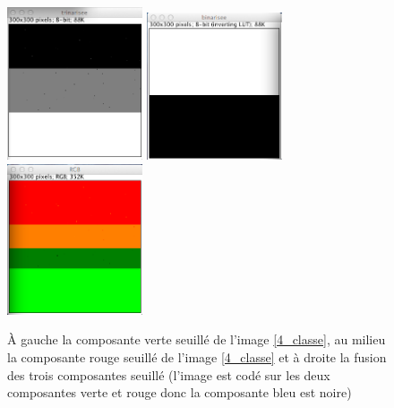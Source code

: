 \documentclass[a4paper,10pt]{article}
\begin{document}
\begin{figure}
\begin{center}
	\includegraphics[width=4cm]{images/4_classe_trinaire}
	\includegraphics[width=4cm]{images/4_classe_binaire}
	\includegraphics[width=4cm]{images/4_classe_fusion}
\end{center}
	\caption{\`A gauche la composante verte seuill\'e de l'image \ref{4_classe}, au milieu la composante rouge seuill\'e de l'image \ref{4_classe} et \`a droite la fusion des trois composantes seuill\'e (l'image est cod\'e sur les deux composantes verte et rouge donc la composante bleu est noire)}
	\label{4_classe_fusion}
\end{figure}
\end{document}
